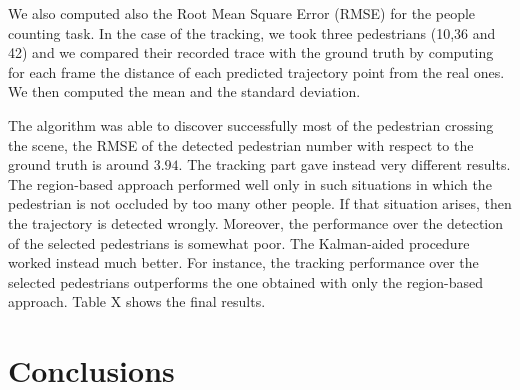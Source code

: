 \documentclass[runningheads]{llncs}
\begin{document}
We also computed also the Root Mean Square Error (RMSE) for the people counting task. In the case of the tracking, we took three pedestrians (10,36 and 42) and we compared their recorded trace with the ground truth by computing for each frame the distance of each predicted trajectory point from the real ones. We then computed the mean and the standard deviation.

The algorithm was able to discover successfully most of the pedestrian crossing the scene, the RMSE of the detected pedestrian number with respect to the ground truth is around $3.94$. 
The tracking part gave instead very different results. The region-based approach performed well only in such situations in which the pedestrian is not occluded by too many other people. If that situation arises, then the trajectory is detected wrongly. Moreover, the performance over the detection of the selected pedestrians is somewhat poor. 
The Kalman-aided procedure worked instead much better. For instance, the tracking performance over the selected pedestrians outperforms the one obtained with only the region-based approach. Table X shows the final results.

\begin{table}[]
\centering
\caption{Mean and standard deviation of the detected trajectories with respect to the real ones.}
\label{table:disp}
\end{table}



\section{Conclusions}

%
%
%
%
%
% 
% 
%


\end{document}
